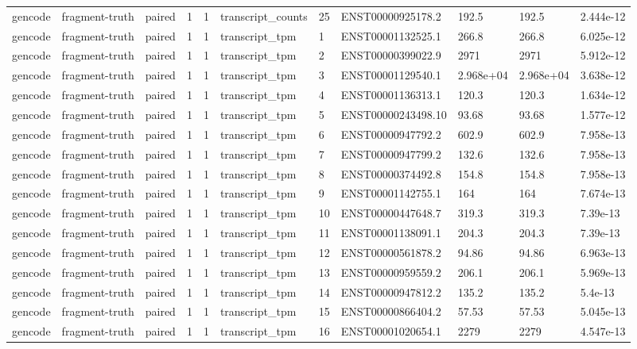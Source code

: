 \begin{tabular}{lllllllllll}
gencode & fragment-truth & paired & 1 & 1 & transcript\_counts & 25 & ENST00000925178.2 & 192.5 & 192.5 & 2.444e-12 \\
gencode & fragment-truth & paired & 1 & 1 & transcript\_tpm & 1 & ENST00001132525.1 & 266.8 & 266.8 & 6.025e-12 \\
gencode & fragment-truth & paired & 1 & 1 & transcript\_tpm & 2 & ENST00000399022.9 & 2971 & 2971 & 5.912e-12 \\
gencode & fragment-truth & paired & 1 & 1 & transcript\_tpm & 3 & ENST00001129540.1 & 2.968e+04 & 2.968e+04 & 3.638e-12 \\
gencode & fragment-truth & paired & 1 & 1 & transcript\_tpm & 4 & ENST00001136313.1 & 120.3 & 120.3 & 1.634e-12 \\
gencode & fragment-truth & paired & 1 & 1 & transcript\_tpm & 5 & ENST00000243498.10 & 93.68 & 93.68 & 1.577e-12 \\
gencode & fragment-truth & paired & 1 & 1 & transcript\_tpm & 6 & ENST00000947792.2 & 602.9 & 602.9 & 7.958e-13 \\
gencode & fragment-truth & paired & 1 & 1 & transcript\_tpm & 7 & ENST00000947799.2 & 132.6 & 132.6 & 7.958e-13 \\
gencode & fragment-truth & paired & 1 & 1 & transcript\_tpm & 8 & ENST00000374492.8 & 154.8 & 154.8 & 7.958e-13 \\
gencode & fragment-truth & paired & 1 & 1 & transcript\_tpm & 9 & ENST00001142755.1 & 164 & 164 & 7.674e-13 \\
gencode & fragment-truth & paired & 1 & 1 & transcript\_tpm & 10 & ENST00000447648.7 & 319.3 & 319.3 & 7.39e-13 \\
gencode & fragment-truth & paired & 1 & 1 & transcript\_tpm & 11 & ENST00001138091.1 & 204.3 & 204.3 & 7.39e-13 \\
gencode & fragment-truth & paired & 1 & 1 & transcript\_tpm & 12 & ENST00000561878.2 & 94.86 & 94.86 & 6.963e-13 \\
gencode & fragment-truth & paired & 1 & 1 & transcript\_tpm & 13 & ENST00000959559.2 & 206.1 & 206.1 & 5.969e-13 \\
gencode & fragment-truth & paired & 1 & 1 & transcript\_tpm & 14 & ENST00000947812.2 & 135.2 & 135.2 & 5.4e-13 \\
gencode & fragment-truth & paired & 1 & 1 & transcript\_tpm & 15 & ENST00000866404.2 & 57.53 & 57.53 & 5.045e-13 \\
gencode & fragment-truth & paired & 1 & 1 & transcript\_tpm & 16 & ENST00001020654.1 & 2279 & 2279 & 4.547e-13 \\

\end{tabular}
